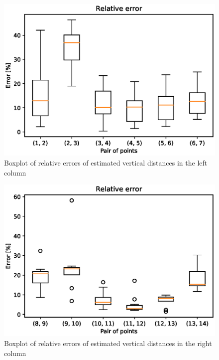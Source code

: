 \begin{figure}
\includegraphics[width=\linewidth]{experiments/63/leftcolumn.eps}
\caption{Boxplot of relative errors of estimated vertical distances in the left column}
\label{table:63left}
\end{figure}

\begin{figure}
\includegraphics[width=\linewidth]{experiments/63/rightcolumn.eps}
\caption{Boxplot of relative errors of estimated vertical distances in the right column}
\label{table:63right}
\end{figure}

